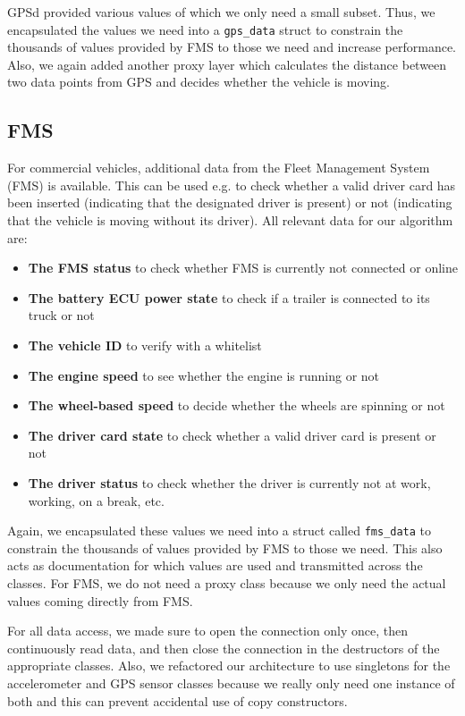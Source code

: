 GPSd provided various values of which we only need a small subset. Thus, we encapsulated the values we need into a \texttt{gps\_data} struct to constrain the thousands of values provided by FMS to those we need and increase performance. Also, we again added another proxy layer which calculates the distance between two data points from GPS and decides whether the vehicle is moving.

\subsection{FMS}
For commercial vehicles, additional data from the Fleet Management System (FMS) is available. This can be used e.g. to check whether a valid driver card has been inserted (indicating that the designated driver is present) or not (indicating that the vehicle is moving without its driver). All relevant data for our algorithm are:

\begin{itemize}
	\item \textbf{The FMS status} to check whether FMS is currently not connected or online
	\item \textbf{The battery ECU power state} to check if a trailer is connected to its truck or not
	\item \textbf{The vehicle ID} to verify with a whitelist
	\item \textbf{The engine speed} to see whether the engine is running or not
	\item \textbf{The wheel-based speed} to decide whether the wheels are spinning or not
	\item \textbf{The driver card state} to check whether a valid driver card is present or not
	\item \textbf{The driver status} to check whether the driver is currently not at work, working, on a break, etc.
\end{itemize}

Again, we encapsulated these values we need into a struct called \texttt{fms\_data} to constrain the thousands of values provided by FMS to those we need. This also acts as documentation for which values are used and transmitted across the classes. For FMS, we do not need a proxy class because we only need the actual values coming directly from FMS.

\vspace{.5cm}

For all data access, we made sure to open the connection only once, then continuously read data, and then close the connection in the destructors of the appropriate classes. Also, we refactored our architecture to use singletons for the accelerometer and GPS sensor classes because we really only need one instance of both and this can prevent accidental use of copy constructors.

\clearpage

